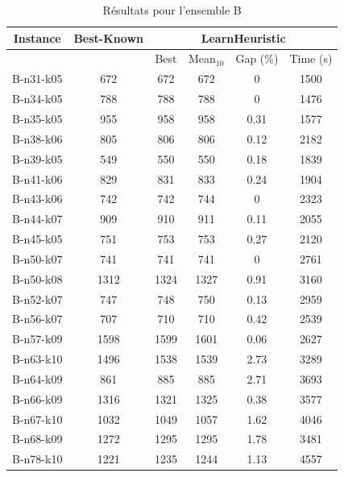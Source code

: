 \documentclass[a4paper,11pt]{article}%
\begin{document}
\begin{table}[h!]
\caption{Résultats pour l'ensemble B}
\label{TB}
\begin{center}
\begin{tabular}{|@{}c@{}|@{}c@{}|@{}c@{}|@{}c@{}|@{}c@{}|@{}c@{}|}

\hline
 Instance & Best-Known & \multicolumn{4}{c|}{LearnHeuristic}  \\
 \hline
 & & Best & Mean$_{10}$ & Gap (\%) & Time (s) \\ 
 \hline
 B-n31-k05 & 672 & 672 & 672 & 0 & 1500  \\
 \hline
 B-n34-k05   & 788 & 788 & 788&0 & 1476   \\
  \hline
   B-n35-k05 & 955 & 958 & 958 &0.31 & 1577  \\
 \hline
   B-n38-k06 & 805 & 806 & 806 &0.12 & 2182  \\
  \hline
   B-n39-k05 & 549 & 550 & 550 & 0.18 & 1839  \\
 \hline
  B-n41-k06  & 829 & 831 & 833 & 0.24 & 1904  \\
  \hline
  B-n43-k06 & 742 & 742 & 744 & 0 & 2323 \\
 \hline
  B-n44-k07  & 909 & 910 & 911 & 0.11 & 2055 \\
 \hline
 B-n45-k05 & 751 & 753 & 753 & 0.27 & 2120 \\
 \hline
   B-n50-k07 & 741 & 741 & 741 & 0 & 2761   \\
  \hline
   B-n50-k08 & 1312 & 1324 & 1327 & 0.91 & 3160  \\
  \hline
  B-n52-k07  & 747 & 748 & 750 &0.13 & 2959  \\
  \hline
  B-n56-k07 & 707 & 710 & 710 & 0.42 & 2539  \\
 \hline
  B-n57-k09  & 1598 & 1599 & 1601 &0.06 & 2627   \\
  \hline
  B-n63-k10  & 1496 & 1538 & 1539 & 2.73 & 3289   \\
  \hline
  B-n64-k09 & 861 & 885 & 885 & 2.71 & 3693 \\
 \hline 
   B-n66-k09 & 1316 & 1321 & 1325 &0.38 & 3577   \\
  \hline 
  B-n67-k10  & 1032 & 1049 & 1057 &1.62 & 4046  \\
  \hline
    B-n68-k09  & 1272 & 1295 & 1295 &1.78 & 3481   \\
  \hline
    B-n78-k10  & 1221 & 1235 & 1244 &1.13 & 4557   \\
  \hline
\end{tabular}
\end{center}
\end{table}
\end{document}

